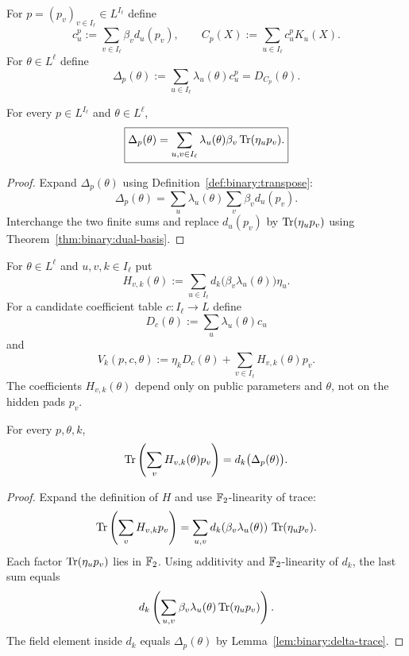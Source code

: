 \begin{definition}\label{def:binary:transpose}
For $p=(p_v)_{v\in I_\ell}\in L^{I_\ell}$ define
\[
 c^p_u:=\sum_{v\in I_\ell}\beta_vd_u(p_v),\qquad
 C_p(X):=\sum_{u\in I_\ell}c^p_uK_u(X).
\]
For $\theta\in L^\ell$ define
\[
 \Delta_p(\theta):=\sum_{u\in I_\ell}
       \lambda_u(\theta)c^p_u
       =D_{C_p}(\theta).
\]
\end{definition}

\begin{lemma}\label{lem:binary:delta-trace}
For every $p\in L^{I_\ell}$ and $\theta\in L^\ell$,
\[
 \boxed{\Delta_p(\theta)=
  \sum_{u,v\in I_\ell}
   \lambda_u(\theta)\beta_v\operatorname{Tr}(\eta_u p_v).}
\]
\end{lemma}
\begin{proof}
Expand $\Delta_p(\theta)$ using
Definition~\ref{def:binary:transpose}:
\[
 \Delta_p(\theta)=
 \sum_u\lambda_u(\theta)\sum_v\beta_vd_u(p_v).
\]
Interchange the two finite sums and replace
$d_u(p_v)$ by $\operatorname{Tr}(\eta_up_v)$ using
Theorem~\ref{thm:binary:dual-basis}.
\end{proof}

\begin{definition}\label{def:binary:affine-H}
For $\theta\in L^\ell$ and $u,v,k\in I_\ell$ put
\[
 H_{v,k}(\theta):=\sum_{u\in I_\ell}
       d_k\bigl(\beta_v\lambda_u(\theta)\bigr)\eta_u.
\]
For a candidate coefficient table $c:I_\ell\to L$ define
\[
 D_c(\theta):=\sum_u\lambda_u(\theta)c_u
\]
and
\[
 V_k(p,c,\theta):=\eta_kD_c(\theta)
      +\sum_{v\in I_\ell}H_{v,k}(\theta)p_v.
\]
The coefficients $H_{v,k}(\theta)$ depend only on public
parameters and $\theta$, not on the hidden pads $p_v$.
\end{definition}

\begin{lemma}\label{lem:binary:affine-trace}
For every $p,\theta,k$,
\[
 \operatorname{Tr}\left(\sum_v H_{v,k}(\theta)p_v\right)
   =d_k\bigl(\Delta_p(\theta)\bigr).
\]
\end{lemma}
\begin{proof}
Expand the definition of $H$ and use
$\mathbb{F}_2$-linearity of trace:
\[
 \operatorname{Tr}\left(\sum_vH_{v,k}p_v\right)
 =\sum_{u,v}
    d_k(\beta_v\lambda_u(\theta))\,\operatorname{Tr}(\eta_up_v).
\]
Each factor $\operatorname{Tr}(\eta_up_v)$ lies in $\mathbb{F}_2$.
Using additivity and $\mathbb{F}_2$-linearity of $d_k$,
the last sum equals
\[
 d_k\left(\sum_{u,v}
   \beta_v\lambda_u(\theta)\operatorname{Tr}(\eta_up_v)\right).
\]
The field element inside $d_k$ equals
$\Delta_p(\theta)$ by Lemma~\ref{lem:binary:delta-trace}.
\end{proof}

